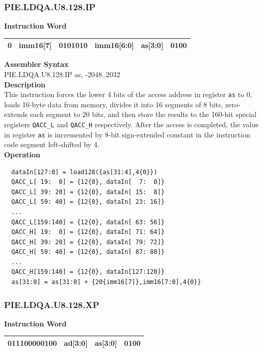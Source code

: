 \newpage
\subsubsection{PIE.LDQA.U8.128.IP}\label{instruction:PIELDQAU8128IP}
\setlength\tabcolsep{6pt}
\textbf{Instruction Word} \\
\begin{tabular}{|c|c|c|c|c|c|}
	\hline
	0 & imm16[7] & 0101010 & imm16[6:0] & as[3:0] & 0100 \\
	\hline
\end{tabular}

\textbf{Assembler Syntax} \\
PIE.LDQA.U8.128.IP as, -2048..2032 \\
\textbf{Description} \\
This instruction forces the lower 4 bits of the access address in register \lstinline{as} to 0, loads 16-byte data from memory, divides it into 16 segments of 8 bits, zero-extends each segment to 20 bits, and then store the results to the 160-bit special registers \lstinline{QACC_L} and \lstinline{QACC_H} respectively. After the access is completed, the value in register \lstinline{as} is incremented by 8-bit sign-extended constant in the instruction code segment left-shifted by 4.\\
\textbf{Operation}
\begin{lstlisting}
  dataIn[127:0] = load128({as[31:4],4{0}})
  QACC_L[ 19:  0] = {12{0}, dataIn[  7:  0]}
  QACC_L[ 39: 20] = {12{0}, dataIn[ 15:  8]}
  QACC_L[ 59: 40] = {12{0}, dataIn[ 23: 16]}
  ...
  QACC_L[159:140] = {12{0}, dataIn[ 63: 56]}
  QACC_H[ 19:  0] = {12{0}, dataIn[ 71: 64]}
  QACC_H[ 39: 20] = {12{0}, dataIn[ 79: 72]}
  QACC_H[ 59: 40] = {12{0}, dataIn[ 87: 80]}
  ...
  QACC_H[159:140] = {12{0}, dataIn[127:120]}
  as[31:0] = as[31:0] + {20{imm16[7]},imm16[7:0],4{0}}
\end{lstlisting}

\newpage
\subsubsection{PIE.LDQA.U8.128.XP}\label{instruction:PIELDQAU8128XP}
\setlength\tabcolsep{6pt}
\textbf{Instruction Word} \\
\begin{tabular}{|c|c|c|c|}
	\hline
	011100000100 & ad[3:0] & as[3:0] & 0100 \\
	\hline
\end{tabular}

